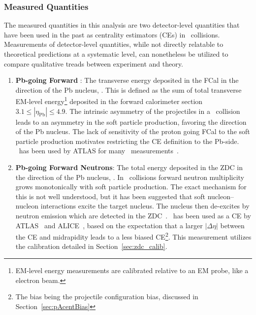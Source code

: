 \subsubsection{Measured Quantities}
The measured quantities in this analysis are two detector-level quantities that have been used in the past as centrality estimators (CEs) in \pxPb\ collisions.
Measurements of detector-level quantities, while not directly relatable to theoretical predictions at a systematic level, can nonetheless be utilized to compare qualitative treads between experiment and theory.

\begin{enumerate}
    \item \textbf{Pb-going Forward \ET}: The transverse energy deposited in the FCal in the direction of the Pb nucleus, \ETPB.  This is defined as the sum of total transverse EM-level energy\footnote{EM-level energy measurements are calibrated relative to an EM probe, like a electron beam.} deposited in the forward calorimeter section $3.1\leq |\eta_{\mathrm{Pb}}| \leq 4.9$. The intrinsic asymmetry of the projectiles in a \pxPb\ collision leads to an asymmetry in the soft particle production, favoring the direction of the Pb nucleus. The lack of sensitivity of the proton going FCal to the soft particle production motivates restricting the CE definition to the Pb-side. \ETPB\ has been used by ATLAS for many \pxPb\ measurements~\cite{HION-2012-14,HION-2013-08,HION-2013-09,HION-2023-05}.
    \item \textbf{Pb-going Forward Neutrons}: The total energy deposited in the ZDC in the direction of the Pb nucleus, \EZDC. In \pxA\ collisions forward neutron multiplicity grows monotonically with soft particle production. The exact mechanism for this is not well understood, but it has been suggested that soft nucleon--nucleon interactions excite the target nucleus. The nucleus then de-excites by neutron emission which are detected in the ZDC~\cite{pPb:woundednucleonevap}. \EZDC\ has been used as a CE by ATLAS~\cite{HION-2021-17} and ALICE~\cite{ALICE:pPbPP,ALICE:pPbDMeson,ALICE:pPbZdcIAA}, based on the expectation that a larger $|\Delta \eta|$ between the CE and midrapidity leads to a less biased CE\footnote{The bias being the projectile configuration bias, discussed in Section~\ref{sec:pAcentBias}}. This measurement utilizes the calibration detailed in Section~\ref{sec:zdc_calib}.
\end{enumerate}

